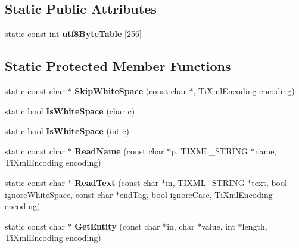 \subsection*{\-Static \-Public \-Attributes}
\begin{DoxyCompactItemize}
\item 
static const int {\bfseries utf8\-Byte\-Table} \mbox{[}256\mbox{]}
\end{DoxyCompactItemize}
\subsection*{\-Static \-Protected \-Member \-Functions}
\begin{DoxyCompactItemize}
\item 
\hypertarget{class_ti_xml_base_ac0c3d66d8a9e6996a1fa016275e16875}{
static const char $\ast$ {\bfseries \-Skip\-White\-Space} (const char $\ast$, \-Ti\-Xml\-Encoding encoding)}
\label{class_ti_xml_base_ac0c3d66d8a9e6996a1fa016275e16875}

\item 
\hypertarget{class_ti_xml_base_af56296d561c0bab4bc8e198cdcf5c48e}{
static bool {\bfseries \-Is\-White\-Space} (char c)}
\label{class_ti_xml_base_af56296d561c0bab4bc8e198cdcf5c48e}

\item 
\hypertarget{class_ti_xml_base_a3de391ea9f4c4a8aa10d04480b048795}{
static bool {\bfseries \-Is\-White\-Space} (int c)}
\label{class_ti_xml_base_a3de391ea9f4c4a8aa10d04480b048795}

\item 
\hypertarget{class_ti_xml_base_a1c21a6ab5f7b503acd91f35f183734b3}{
static const char $\ast$ {\bfseries \-Read\-Name} (const char $\ast$p, \-T\-I\-X\-M\-L\-\_\-\-S\-T\-R\-I\-N\-G $\ast$name, \-Ti\-Xml\-Encoding encoding)}
\label{class_ti_xml_base_a1c21a6ab5f7b503acd91f35f183734b3}

\item 
\hypertarget{class_ti_xml_base_aa646c74921aa33156968b802bbf5566e}{
static const char $\ast$ {\bfseries \-Read\-Text} (const char $\ast$in, \-T\-I\-X\-M\-L\-\_\-\-S\-T\-R\-I\-N\-G $\ast$text, bool ignore\-White\-Space, const char $\ast$end\-Tag, bool ignore\-Case, \-Ti\-Xml\-Encoding encoding)}
\label{class_ti_xml_base_aa646c74921aa33156968b802bbf5566e}

\item 
\hypertarget{class_ti_xml_base_ac5c08bf3deffcda0bf8ce2958372b584}{
static const char $\ast$ {\bfseries \-Get\-Entity} (const char $\ast$in, char $\ast$value, int $\ast$length, \-Ti\-Xml\-Encoding encoding)}
\label{class_ti_xml_base_ac5c08bf3deffcda0bf8ce2958372b584}


\end{DoxyCompactItemize}
